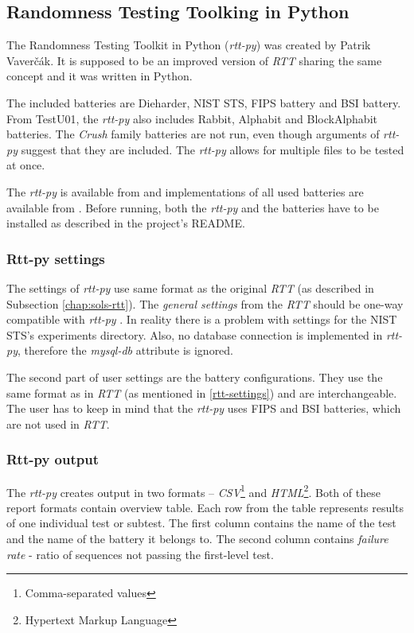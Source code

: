\documentclass[
  digital,     %
  oneside,     %
  nosansbold,  %
  nocolorbold, %
  nolof,         %
  nolot,         %
]{fithesis4}
\begin{document}
\subsection{Randomness Testing Toolking in Python} \label{chap:sols-rtt-py}
The Randomness Testing Toolkit in Python (\emph{rtt-py}) was created by Patrik Vaverčák. It is supposed to be an improved version of \emph{RTT} sharing the same concept \cite[p.~24]{vavercak} and it was written in Python.

The included batteries are Dieharder, NIST STS, FIPS battery and BSI battery. From TestU01, the \emph{rtt-py} also includes Rabbit, Alphabit and BlockAlphabit batteries. The \emph{Crush} family batteries are not run, even though arguments of \emph{rtt-py} suggest that they are included. The \emph{rtt-py} allows for multiple files to be tested at once.


The \emph{rtt-py} is available from \cite{rtt-py-site} and implementations of all used batteries are available from \cite{rtt-py-batteries}. Before running, both the \emph{rtt-py} and the batteries have to be installed as described in the project's README.



\subsubsection{Rtt-py settings}
The settings of \emph{rtt-py} use same format as the original \emph{RTT} (as described in Subsection \ref{chap:sols-rtt}). The \emph{general settings} from the \emph{RTT} should be one-way compatible with \emph{rtt-py} \cite[p. 25]{vavercak}. In reality there is a problem with settings for the NIST STS's experiments directory. Also, no database connection is implemented in \emph{rtt-py}, therefore the \emph{mysql-db} attribute is ignored. \cite{rtt-py-site}

The second part of user settings are the battery configurations. They use the same format as in \emph{RTT} (as mentioned in \ref{rtt-settings}) and are interchangeable.~\cite[p.~25]{vavercak} The user has to keep in mind that the \emph{rtt-py} uses FIPS and BSI batteries, which are not used in \emph{RTT}. 

\subsubsection{Rtt-py output}
The \emph{rtt-py} creates output in two formats -- \emph{CSV}\footnote{Comma-separated values} and \emph{HTML}\footnote{Hypertext Markup Language}. \cite[p. 36]{vavercak} Both of these report formats contain overview table. Each row from the table represents results of one individual test or subtest. The first column contains the name of the test and the name of the battery it belongs to. The second column contains \emph{failure rate} - ratio of sequences not passing the first-level test.
\end{document}
